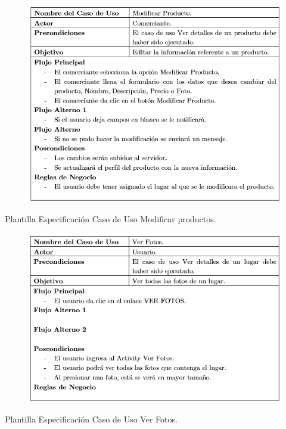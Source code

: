 \documentclass[12pt,letterpaper,openany]{book}
\begin{document}
\begin{table}[H]
\begin{center}
\begin{figure}[H]
\begin{center}
\includegraphics[width=13cm]{./imagenes/PCU/modificar_producto}
\end{center}
\end{figure}
\end{center}
\caption{Plantilla Especificación Caso de Uso Modificar productos.}
\end{table}

\begin{table}[H]
\begin{center}
\begin{figure}[H]
\begin{center}
\includegraphics[width=13cm]{./imagenes/PCU/ver_fotos}
\end{center}
\end{figure}
\end{center}
\caption{Plantilla Especificación Caso de Uso Ver Fotos.}
\end{table}
\end{document}
